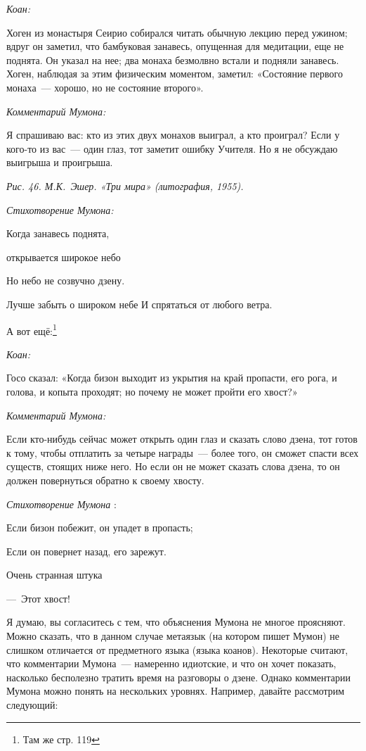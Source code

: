 \documentclass[../main.tex]{subfiles}
\begin{document}
\emph{Коан:}

Хоген из монастыря Сеирио собирался читать обычную лекцию перед ужином; вдруг он заметил, что бамбуковая занавесь, опущенная для медитации, еще не поднята. Он указал на нее; два монаха безмолвно встали и подняли занавесь. Хоген, наблюдая за этим физическим моментом, заметил: «Состояние первого монаха~--- хорошо, но не состояние второго».

\emph{Комментарий Мумона:}

Я спрашиваю вас: кто из этих двух монахов выиграл, а кто проиграл? Если у кого-то из вас~--- один глаз, тот заметит ошибку Учителя. Но я не обсуждаю выигрыша и проигрыша.

\emph{Рис. 46. М.К.~Эшер. «Три мира» (литография, 1955).}

\emph{Стихотворение Мумона:}

Когда занавесь поднята,

открывается широкое небо

Но небо не созвучно дзену.

Лучше забыть о широком небе И спрятаться от любого ветра.

А вот ещё:\footnote{Там же стр. 119}

\emph{Коан:}

Госо сказал: «Когда бизон выходит из укрытия на край пропасти, его рога, и голова, и копыта проходят; но почему не может пройти его хвост?»

\emph{Комментарий Мумона:}

Если кто-нибудь сейчас может открыть один глаз и сказать слово дзена, тот готов к тому, чтобы отплатить за четыре награды~--- более того, он сможет спасти всех существ, стоящих ниже него. Но если он не может сказать слова дзена, то он должен повернуться обратно к своему хвосту.

\emph{Стихотворение Мумона} :

Если бизон побежит, он упадет в пропасть;

Если он повернет назад, его зарежут.

Очень странная штука

---~Этот хвост!

Я думаю, вы согласитесь с тем, что объяснения Мумона не многое проясняют. Можно сказать, что в данном случае метаязык (на котором пишет Мумон) не слишком отличается от предметного языка (языка коанов). Некоторые считают, что комментарии Мумона~--- намеренно идиотские, и что он хочет показать, насколько бесполезно тратить время на разговоры о дзене. Однако комментарии Мумона можно понять на нескольких уровнях. Например, давайте рассмотрим следующий:
\end{document}
